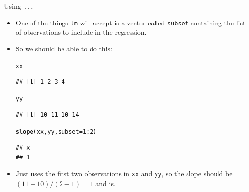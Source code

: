 \documentclass[unknownkeysallowed]{beamer}\usepackage[]{graphicx}\usepackage[]{color}
\makeatletter
\newcommand{\hlnum}[1]{\textcolor[rgb]{0.686,0.059,0.569}{#1}}%
\newcommand{\hlopt}[1]{\textcolor[rgb]{0,0,0}{#1}}%
\newcommand{\hlstd}[1]{\textcolor[rgb]{0.345,0.345,0.345}{#1}}%
\newcommand{\hlkwc}[1]{\textcolor[rgb]{0.333,0.667,0.333}{#1}}%
\newcommand{\hlkwd}[1]{\textcolor[rgb]{0.737,0.353,0.396}{\textbf{#1}}}%
\newenvironment{kframe}{%
 \def\at@end@of@kframe{}%
 \ifinner\ifhmode%
  \def\at@end@of@kframe{\end{minipage}}%
  \begin{minipage}{\columnwidth}%
 \fi\fi%
 \def\FrameCommand##1{\hskip\@totalleftmargin \hskip-\fboxsep
 \colorbox{shadecolor}{##1}\hskip-\fboxsep
     \hskip-\linewidth \hskip-\@totalleftmargin \hskip\columnwidth}%
 \MakeFramed {\advance\hsize-\width
   \@totalleftmargin\z@ \linewidth\hsize
   \@setminipage}}%
 {\par\unskip\endMakeFramed%
 \at@end@of@kframe}
\newenvironment{knitrout}{}{} %
\makeatother
\begin{document}
\begin{frame}[fragile]{Using \texttt{...}}
  
  \begin{itemize}
  \item One of the things \texttt{lm} will accept is a vector called
    \texttt{subset} containing the list of observations to include in
    the regression.
  \item So we should be able to do this:
    
\begin{knitrout}
\color{fgcolor}\begin{kframe}
\begin{alltt}
\hlstd{xx}
\end{alltt}
\begin{verbatim}
## [1] 1 2 3 4
\end{verbatim}
\begin{alltt}
\hlstd{yy}
\end{alltt}
\begin{verbatim}
## [1] 10 11 10 14
\end{verbatim}
\begin{alltt}
\hlkwd{slope}\hlstd{(xx,yy,}\hlkwc{subset}\hlstd{=}\hlnum{1}\hlopt{:}\hlnum{2}\hlstd{)}
\end{alltt}
\begin{verbatim}
## x 
## 1
\end{verbatim}
\end{kframe}
\end{knitrout}
\item Just uses the first two observations in \texttt{xx} and
  \texttt{yy}, so the slope should be $(11-10)/(2-1)=1$ and is.
  \end{itemize}
  
\end{frame}
\end{document}
